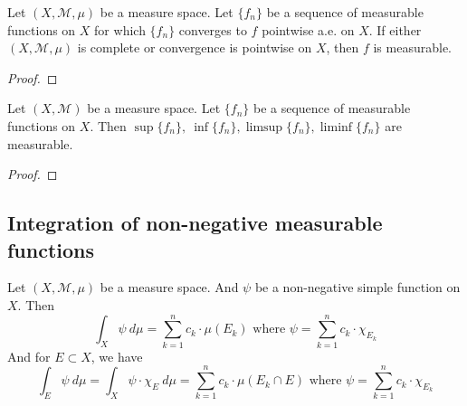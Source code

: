 \begin{theorem}
	Let $(X,\mathcal{M},\mu)$ be a measure space.
	Let $\{ f_n \}$ be a sequence of measurable functions on $X$ for which $\{ f_n \}$ converges to $f$ pointwise a.e. on $X$.
	If either $(X,\mathcal{M},\mu)$ is complete or convergence is pointwise on $X$, then $f$ is measurable.
\end{theorem}
\begin{proof}
\end{proof}

\begin{corollary}
	Let $(X,\mathcal{M})$ be a measure space.
	Let $\{ f_n \}$ be a sequence of measurable functions on $X$.
	Then $\sup\{f_n\},\ \inf\{f_n\},\limsup\{f_n\},\liminf\{f_n\}$ are measurable.
\end{corollary}
\begin{proof}
\end{proof}


\subsection{Integration of non-negative measurable functions}
\begin{definition}
	Let $(X,\mathcal{M},\mu)$ be a measure space.
	And $\psi$ be a non-negative simple function on $X$.
	Then 
	\begin{equation}
		\int_X \psi\ d\mu = \sum_{k=1}^n c_k \cdot \mu(E_k) \text{ where } \psi = \sum_{k=1}^n c_k \cdot \chi_{E_k}
	\end{equation}
	And for $E \subset X$, we have
	\begin{equation}
		\int_E \psi\ d\mu = \int_X \psi \cdot \chi_E\ d\mu = \sum_{k=1}^n c_k \cdot \mu(E_k \cap E) \text{ where } \psi = \sum_{k=1}^n c_k \cdot \chi_{E_k}
	\end{equation}
\end{definition}


